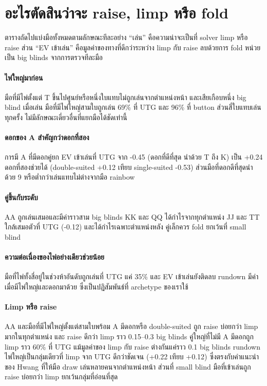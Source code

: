 \documentclass[11pt]{article}
\begin{document}
\section{อะไรตัดสินว่าจะ raise, limp หรือ fold}
ตารางถัดไปแบ่งมือทั้งหมดตามลักษณะทีละอย่าง ``เล่น'' คือความน่าจะเป็นที่ solver limp หรือ raise ส่วน ``EV
เข้าเล่น'' คือมูลค่าของทางที่ดีกว่าระหว่าง limp กับ raise ลบด้วยการ fold หน่วยเป็น big blinds จากการตรวจทีละมือ

\begin{table}[H]
\centering
\caption{อัตราการเล่นและ EV เข้าเล่นแยกตามลักษณะทีละอย่าง}
\small

\end{table}

\paragraph{ไพ่ใหญ่มาก่อน} มือที่มีไพ่ตั้งแต่ T ขึ้นไปศูนย์หรือหนึ่งใบแทบไม่ถูกเล่นจากตำแหน่งหน้า และเสียเกือบหนึ่ง
big blind เมื่อเล่น มือที่มีไพ่ใหญ่สามใบถูกเล่น 69\% ที่ UTG และ 96\% ที่ button ส่วนสี่ใบแทบเล่นทุกครั้ง
ไม่มีลักษณะเดี่ยวอื่นที่แยกมือได้ชัดเท่านี้

\paragraph{ดอกของ A สำคัญกว่าดอกที่สอง} การมี A ที่มีดอกคู่ยก EV เข้าเล่นที่ UTG จาก -0.45 (ดอกที่ดีที่สุด
นำด้วย T ถึง K) เป็น +0.24 ดอกที่สองช่วยได้ (double-suited +0.12 เทียบ single-suited -0.53)
ส่วนมือที่ดอกดีที่สุดนำด้วย 9 หรือต่ำกว่าเล่นแทบไม่ต่างจากมือ rainbow

\paragraph{คู่ขึ้นกับระดับ} AA ถูกเล่นเสมอและมีค่าราวสาม big blinds KK และ QQ ได้กำไรจากทุกตำแหน่ง
JJ และ TT ใกล้เสมอตัวที่ UTG (-0.12) และได้กำไรเฉพาะตำแหน่งหลัง คู่เล็กควร fold ยกเว้นที่ small blind

\paragraph{ความต่อเนื่องของไพ่อย่างเดียวช่วยน้อย} มือที่ไพ่ทั้งสี่อยู่ในช่วงห้าอันดับถูกเล่นที่ UTG แค่ 35\% และ
EV เข้าเล่นยังติดลบ rundown มีค่าเมื่อมีไพ่ใหญ่และดอกมาด้วย ซึ่งเป็นปฏิสัมพันธ์ที่ archetype ของเราใช้

\paragraph{Limp หรือ raise} AA และมือที่มีไพ่ใหญ่ตั้งแต่สามใบพร้อม A มีดอกหรือ double-suited ถูก raise
บ่อยกว่า limp มากในทุกตำแหน่ง และ raise ดีกว่า limp ราว 0.15--0.3 big blinds คู่ใหญ่ที่ไม่มี A มีดอกถูก limp
ราว 60\% ที่ UTG แม้มูลค่าของ limp กับ raise ต่างกันแค่ราว 0.1 big blinds rundown ไพ่ใหญ่เป็นกลุ่มเดียวที่ limp
จาก UTG ดีกว่าชัดเจน (+0.22 เทียบ +0.12) ซึ่งตรงกับคำแนะนำของ Hwang ที่ให้มือ draw เล่นหลายคนจากตำแหน่งหน้า
ส่วนที่ small blind มือที่เข้าเล่นถูก raise บ่อยกว่า limp ยกเว้นกลุ่มที่อ่อนที่สุด
\end{document}
